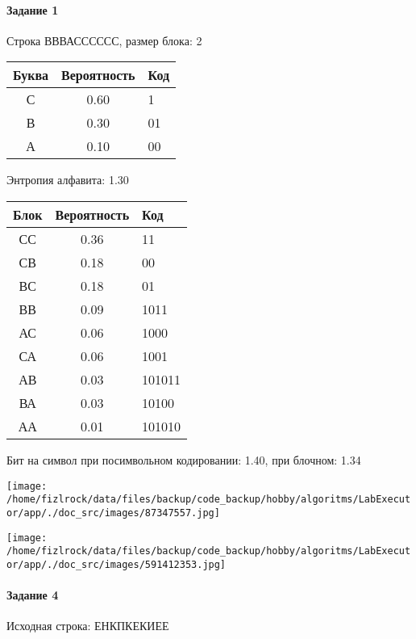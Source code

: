 \documentclass[a4paper, 12pt]{article}
\begin{document}
\paragraph{Задание 1}

Строка ВВВАСССССС, размер блока: 2
\begin{center}
 \begin{tabular}{ |c|c|l| } 
  \hline
     Буква & Вероятность & Код\\ \hline
С & 0.60 & 1\\\hline
В & 0.30 & 01\\\hline
А & 0.10 & 00
\\ \hline \end{tabular}
\end{center}
Энтропия алфавита: 1.30
\begin{center}
 \begin{tabular}{ |c|c|l| } 
  \hline
     Блок & Вероятность & Код\\ \hline
СС & 0.36 & 11\\\hline
СВ & 0.18 & 00\\\hline
ВС & 0.18 & 01\\\hline
ВВ & 0.09 & 1011\\\hline
АС & 0.06 & 1000\\\hline
СА & 0.06 & 1001\\\hline
АВ & 0.03 & 101011\\\hline
ВА & 0.03 & 10100\\\hline
АА & 0.01 & 101010
\\ \hline \end{tabular}
\end{center}
Бит на символ при посимвольном кодировании: 1.40, при блочном: 1.34

\texttt{[image: /home/fizlrock/data/files/backup/code\_backup/hobby/algoritms/LabExecutor/app/./doc\_src/images/87347557.jpg]}

\texttt{[image: /home/fizlrock/data/files/backup/code\_backup/hobby/algoritms/LabExecutor/app/./doc\_src/images/591412353.jpg]}
\paragraph{Задание 4}


Исходная строка: ЕНКПКЕКИЕЕ
\end{document}

